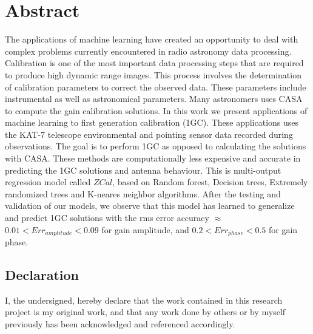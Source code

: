 \chapter*{Abstract} 


The applications of machine learning have created an opportunity to deal with complex problems currently encountered in radio astronomy data processing. Calibration is one of the most important data processing steps that are required to produce high dynamic range images. This process involves the determination of calibration parameters to correct the observed data. These parameters include instrumental as well as astronomical parameters. Many astronomers uses CASA to compute the gain calibration solutions. In this work we present applications of machine learning to first generation calibration (1GC). These applications uses the KAT-7 telescope environmental and pointing sensor data recorded during observations. The goal is to perform 1GC as opposed to calculating the solutions with CASA. These methods are computationally less expensive and accurate in predicting the 1GC solutions and antenna behaviour. This is multi-output regression model called $\textit{ZCal}$, based on Random forest, Decision trees, Extremely randomized trees and K-neares neighbor algorithms. After the testing and validation of our models, we observe that this model has learned to generalize and predict 1GC solutions with the rms error accuracy $\approx$ $0.01<Err_{amplitude}<0.09$ for gain amplitude, and $0.2<Err_{phase}<0.5$ for gain phase.  


\vfill
\section*{Declaration}
I, the undersigned, hereby declare that the work contained in this research project is my original work, and that any work done by others or by myself previously has been acknowledged and referenced accordingly.

